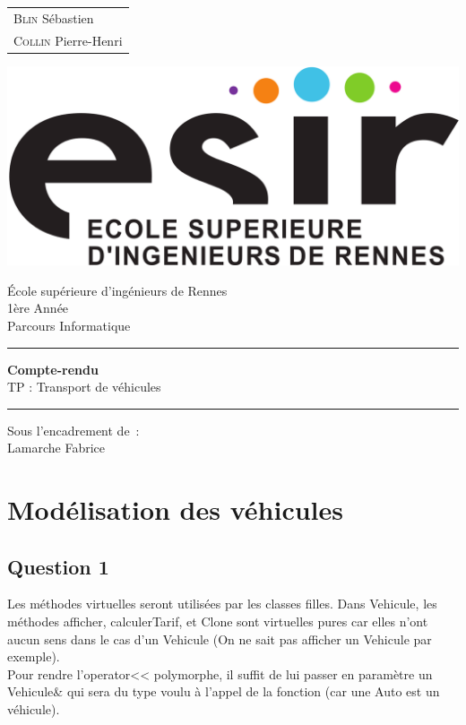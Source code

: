 \documentclass{article}
\begin{document}
\begin{titlepage}
	\vspace{-20px}
	\begin{tabular}{l}
		\textsc{Blin} S\'ebastien\\
		\textsc{Collin} Pierre-Henri
	\end{tabular}
	\hfill \vspace{10px}\includegraphics[scale=0.1]{esir}\\
	\vfill
	\begin{center}
		\Huge{\'Ecole sup\'erieure d'ing\'enieurs de Rennes}\\
		\vspace{1cm}
		\LARGE{1\`ere Ann\'ee}\\
		\large{Parcours Informatique}\\
		\vspace{0.5cm}\hrule\vspace{0.5cm}
		\LARGE{\textbf{Compte-rendu}}\\
		\Large{TP  : Transport de v\'ehicules}
		\vspace{0.5cm}\hrule
		\vfill
		\vfill
	\end{center}
	\begin{flushleft}
		\Large{Sous l'encadrement de~:}\\
		\vspace{0.2cm}
		\large{{Lamarche} Fabrice}
	\end{flushleft}
	\vfill
\end{titlepage}

\section{Mod\'elisation des v\'ehicules}
\subsection{Question 1}
Les m\'ethodes virtuelles seront utilis\'ees par les classes filles. Dans Vehicule, les m\'ethodes afficher, calculerTarif, et Clone sont virtuelles pures car elles n'ont aucun sens dans le cas d'un Vehicule (On ne sait pas afficher un Vehicule par exemple).\\
Pour rendre l'operator<< polymorphe, il suffit de lui passer en param\`etre un Vehicule\& qui sera du type voulu \`a l'appel de la fonction (car une Auto est un v\'ehicule).
\end{document}
